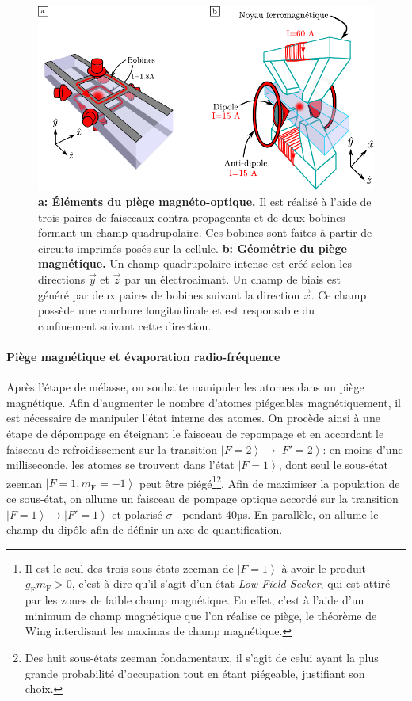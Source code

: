 \begin{figure}
\centering
\includegraphics[width=\textwidth]{Fig/BEC_manip/MOT_magtrap.pdf}
\caption{\textbf{a: Éléments du piège magnéto-optique.} Il est réalisé à l'aide de trois paires de faisceaux contra-propageants et de deux bobines formant un champ quadrupolaire. Ces bobines sont faites à partir de circuits imprimés posés sur la cellule. \textbf{b: Géométrie du piège magnétique.} Un champ quadrupolaire intense est créé selon les directions $\vec{y}$ et $\vec{z}$ par un électroaimant. Un champ de biais est généré par deux paires de bobines suivant la direction $\vec{x}$. Ce champ possède une courbure longitudinale et est responsable du confinement suivant cette direction. }
\label{fig:MOT_magtrap}
\end{figure}

\paragraph*{Piège magnétique et évaporation radio-fréquence}
Après l'étape de mélasse, on souhaite manipuler les atomes dans un piège magnétique. Afin d'augmenter le nombre d'atomes piégeables magnétiquement, il est nécessaire de manipuler l'état interne des atomes. On procède ainsi à une étape de dépompage en éteignant le faisceau de repompage et en accordant le faisceau de refroidissement sur la transition $\left| F=2 \right\rangle \rightarrow\left| F'=2 \right\rangle$: en moins d'une milliseconde, les atomes se trouvent dans l'état $\left| F=1 \right\rangle$, dont seul le sous-état zeeman $\left| F=1, m_{\mathrm{F}}=-1 \right\rangle$ peut être piégé\footnote{Il est le seul des trois sous-états zeeman de $\left| F=1 \right\rangle$ à avoir le produit $g_{\mathrm{F}} m_{\mathrm{F}} > 0$, c'est à dire qu'il s'agit d'un état \emph{Low Field Seeker}, qui est attiré par les zones de faible champ magnétique. En effet, c'est à l'aide d'un minimum de champ magnétique que l'on réalise ce piège, le théorème de Wing interdisant les maximas de champ magnétique. }\footnote{Des huit sous-états zeeman fondamentaux, il s'agit de celui ayant la plus grande probabilité d'occupation tout en étant piégeable, justifiant son choix. }. Afin de maximiser la population de ce sous-état, on allume un faisceau de pompage optique accordé sur la transition $\left| F=1 \right\rangle \rightarrow \left| F'=1 \right\rangle$ et polarisé $\sigma^-$ pendant 40µs. En parallèle, on allume le champ du dipôle afin de définir un axe de quantification.

